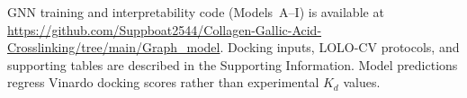 \documentclass[11pt]{article}
\begin{document}
GNN training and interpretability code (Models~A--I) is available at
\url{https://github.com/Suppboat2544/Collagen-Gallic-Acid-Crosslinking/tree/main/Graph_model}.
Docking inputs, LOLO-CV protocols, and supporting tables are described in the
Supporting Information.  Model predictions regress Vinardo docking scores
rather than experimental $K_{d}$ values.


\clearpage
\setlength{\intextsep}{2pt plus 1pt minus 1pt}
\setlength{\floatsep}{2pt plus 1pt minus 1pt}
\setlength{\textfloatsep}{2pt plus 1pt minus 1pt}
\setlength{\dblfloatsep}{2pt plus 1pt minus 1pt}
\setlength{\dbltextfloatsep}{4pt plus 1pt minus 1pt}
\setlength{\abovecaptionskip}{3pt}
\setlength{\belowcaptionskip}{1pt}
\end{document}
